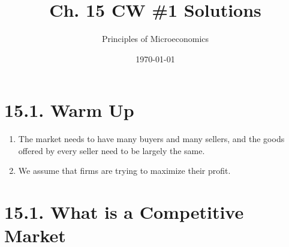 \documentclass{article}
\title{Ch. 15 CW \#1 Solutions}
\author{Principles of Microeconomics}
\date{\today}
\begin{document}
\maketitle

\section*{15.1. Warm Up}

\begin{enumerate}

\item The market needs to have many buyers and many sellers, and the goods offered by every seller need to be largely the same.

\item We assume that firms are trying to maximize their profit. 

\end{enumerate}

\section*{15.1. What is a Competitive Market}
\end{document}
